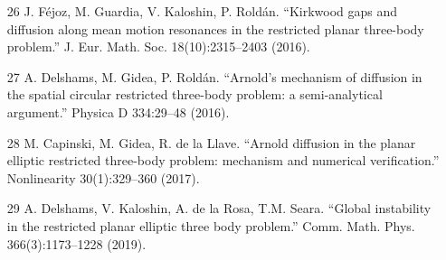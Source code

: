 \documentclass[12pt]{article}
\begin{document}
\begin{enumerate}
\item [26] J. Féjoz, M. Guardia, V. Kaloshin, P. Roldán. ``Kirkwood gaps and diffusion along mean motion resonances in the restricted planar three-body problem.'' J. Eur. Math. Soc. 18(10):2315--2403 (2016).
\item [27] A. Delshams, M. Gidea, P. Roldán. ``Arnold’s mechanism of diffusion in the spatial circular restricted three-body problem: a semi-analytical argument.'' Physica D 334:29--48 (2016).
\item [28] M. Capinski, M. Gidea, R. de la Llave. ``Arnold diffusion in the planar elliptic restricted three-body problem: mechanism and numerical verification.'' Nonlinearity 30(1):329--360 (2017).
\item [29] A. Delshams, V. Kaloshin, A. de la Rosa, T.M. Seara. ``Global instability in the restricted planar elliptic three body problem.'' Comm. Math. Phys. 366(3):1173--1228 (2019).
\end{enumerate}
\end{document}
